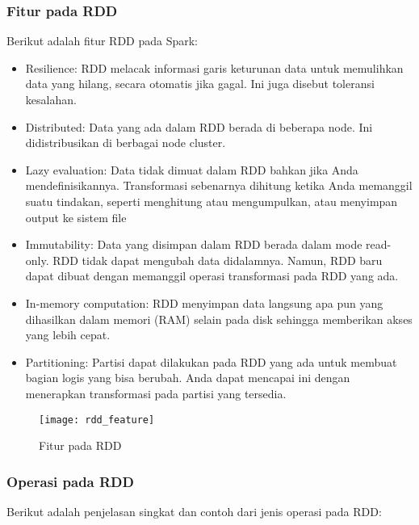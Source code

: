 \subsubsection{Fitur pada RDD}
\noindent Berikut adalah fitur RDD pada Spark:
\begin{itemize}
\item Resilience: RDD melacak informasi garis keturunan data untuk memulihkan data yang hilang, secara otomatis jika gagal. Ini juga disebut toleransi kesalahan.

\item Distributed: Data yang ada dalam RDD berada di beberapa node. Ini didistribusikan di berbagai node cluster.

\item Lazy evaluation: Data tidak dimuat dalam RDD bahkan jika Anda mendefinisikannya. Transformasi sebenarnya dihitung ketika Anda memanggil suatu tindakan, seperti menghitung atau mengumpulkan, atau menyimpan output ke sistem file

\item Immutability: Data yang disimpan dalam RDD berada dalam mode read-only. RDD tidak dapat mengubah data didalamnya. Namun, RDD baru dapat dibuat dengan memanggil operasi transformasi pada RDD yang ada.

\item In-memory computation: RDD menyimpan data langsung apa pun yang dihasilkan dalam memori (RAM) selain pada disk sehingga memberikan akses yang lebih cepat.

\item Partitioning: Partisi dapat dilakukan pada RDD yang ada untuk membuat bagian logis yang bisa berubah. Anda dapat mencapai ini dengan menerapkan transformasi pada partisi yang tersedia.
\end{itemize}

\begin{figure}[H]
	\centering
	\texttt{[image: rdd\_feature]}
	\caption{Fitur pada RDD}
	\label{fig:rdd_feature}
\end{figure}



\subsubsection{Operasi pada RDD}
\noindent Berikut adalah penjelasan singkat dan contoh dari jenis operasi pada RDD:

